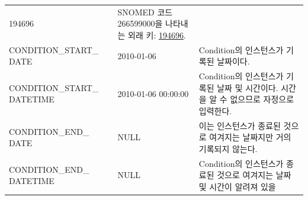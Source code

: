\documentclass[11pt]{book}
\theoremstyle{definition}
\theoremstyle{definition}
\theoremstyle{definition}
\theoremstyle{remark}
\begin{document}
\begin{longtable}[]{@{}lll@{}}
\begin{minipage}[t]{0.16\columnwidth}
194696\strut
\end{minipage} & \begin{minipage}[t]{0.48\columnwidth}\raggedright\strut
SNOMED 코드 266599000을 나타내는 외래 키:
\href{http://athena.ohdsi.org/search-terms/terms/194696}{194696}.\strut
\end{minipage}\tabularnewline
\begin{minipage}[t]{0.28\columnwidth}\raggedright\strut
CONDITION\_START\_ DATE\strut
\end{minipage} & \begin{minipage}[t]{0.16\columnwidth}\raggedright\strut
2010-01-06\strut
\end{minipage} & \begin{minipage}[t]{0.48\columnwidth}\raggedright\strut
Condition의 인스턴스가 기록된 날짜이다.\strut
\end{minipage}\tabularnewline
\begin{minipage}[t]{0.28\columnwidth}\raggedright\strut
CONDITION\_START\_ DATETIME\strut
\end{minipage} & \begin{minipage}[t]{0.16\columnwidth}\raggedright\strut
2010-01-06 00:00:00\strut
\end{minipage} & \begin{minipage}[t]{0.48\columnwidth}\raggedright\strut
Condition의 인스턴스가 기록된 날짜 및 시간이다. 시간을 알 수 없으므로
자정으로 입력한다.\strut
\end{minipage}\tabularnewline
\begin{minipage}[t]{0.28\columnwidth}\raggedright\strut
CONDITION\_END\_ DATE\strut
\end{minipage} & \begin{minipage}[t]{0.16\columnwidth}\raggedright\strut
NULL\strut
\end{minipage} & \begin{minipage}[t]{0.48\columnwidth}\raggedright\strut
이는 인스턴스가 종료된 것으로 여겨지는 날짜지만 거의 기록되지
않는다.\strut
\end{minipage}\tabularnewline
\begin{minipage}[t]{0.28\columnwidth}\raggedright\strut
CONDITION\_END\_ DATETIME\strut
\end{minipage} & \begin{minipage}[t]{0.16\columnwidth}\raggedright\strut
NULL\strut
\end{minipage} & \begin{minipage}[t]{0.48\columnwidth}\raggedright\strut
Condition의 인스턴스가 종료된 것으로 여겨지는 날짜 및 시간이 알려져 있을

\end{minipage}
\end{longtable}
\end{document}
